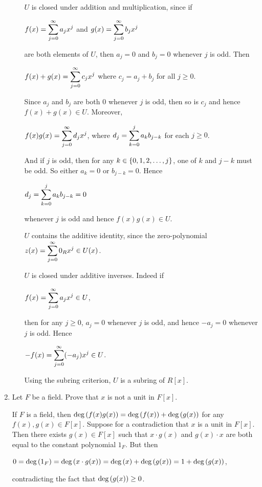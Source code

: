 \documentclass[11pt,fleqn,dvipsnames,usenames]{article}
\newcommand{\p}{\noindent}
\begin{document}
\begin{enumerate}[1.]
\begin{enumerate}[(a)]
\p $U$ is closed under addition and multiplication, since if
\begin{center}
$f(x) = \displaystyle\sum\limits_{j=0}^{\infty}a_{j}x^{j}$ and $g(x) = \displaystyle\sum\limits_{j=0}^{\infty}b_{j}x^{j}$
\end{center}
are both elements of $U$, then $a_{j} = 0$ and $b_{j} = 0$ whenever $j$ is odd.  Then
\begin{center}
$f(x) + g(x) = \displaystyle\sum\limits_{j=0}^{\infty}c_{j}x^{j}$ where $c_{j} = a_{j} + b_{j}$ for all $j\geq 0$.
\end{center}
Since $a_{j}$ and $b_{j}$ are both $0$ whenever $j$ is odd, then so is $c_{j}$ and hence $f(x)+g(x)\in U$.  Moreover, \begin{center}
$f(x)g(x) = \displaystyle\sum\limits_{j=0}^{\infty}d_{j}x^{j}$, where $d_{j} = \displaystyle\sum\limits_{k=0}^{j}a_{k}b_{j-k}$ for each $j\geq 0$.
\end{center}
And if $j$ is odd, then for any $k\in\left\{0,1,2,\ldots, j\right\}$, one of $k$ and $j-k$ must be odd.  So either $a_{k} = 0$ or $b_{j-k} = 0$.  Hence
\begin{center}
$d_{j} = \displaystyle\sum\limits_{k=0}^{j}a_{k}b_{j-k} = 0$
\end{center}
whenever $j$ is odd and hence $f(x)g(x)\in U$.
\vsp

$U$ contains the additive identity, since the zero-polynomial $z(x) = \displaystyle\sum\limits_{j=0}^{\infty}0_{R}x^{j}\in U(x)$.
\vsp

$U$ is closed under additive inverses.  Indeed if
\begin{center}
$f(x) = \displaystyle\sum\limits_{j=0}^{\infty}a_{j}x^{j}\in U$,
\end{center}
then for any $j\geq 0$, $a_{j} = 0$ whenever $j$ is odd, and hence $-a_{j} = 0$ whenever $j$ is odd.  Hence
\begin{center}
$-f(x) =  \displaystyle\sum\limits_{j=0}^{\infty}(-a_{j})x^{j}\in U$.
\end{center}
\vsp

Using the subring criterion, $U$ is a subring of $R[x]$.
\end{enumerate}

\item Let $F$ be a field.  Prove that $x$ is not a unit in $F[x]$.
\vsmsp

\solution If $F$ is a field, then $\text{deg}\left(f(x)g(x)\right) = \text{deg}\left(f(x)\right) + \text{deg}\left(g(x)\right)$ for any $f(x),g(x)\in F[x]$.  Suppose for a contradiction that $x$ is a unit in $F[x]$.  Then there exists $g(x)\in F[x]$ such that $x\cdot g(x)$ and $g(x)\cdot x$ are both equal to the constant polynomial $1_{F}$.  But then
\begin{center}
$0 = \text{deg}\left(1_{F}\right) = \text{deg}\left(x\cdot g(x)\right) = \text{deg}\left(x\right) + \text{deg}\left(g(x)\right) = 1 + \text{deg}\left(g(x)\right)$,
\end{center}
contradicting the fact that $\text{deg}\left(g(x)\right)\geq 0$.


\end{enumerate}
\end{document}
